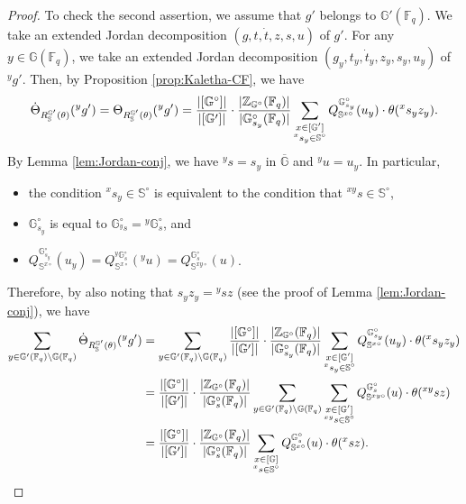 \documentclass{amsart}
\newcommand{\F}{\mathbb{F}}
\newcommand{\bbS}{\mathbb{S}}
\newcommand{\bbG}{\mathbb{G}}
\newcommand{\bbZ}{\mathbb{Z}}
\theoremstyle{plain}
\theoremstyle{definition}
\theoremstyle{remark}
\theoremstyle{theorem}
\begin{document}
\begin{proof}
To check the second assertion, we assume that $g'$ belongs to $\bbG'(\F_{q})$.
We take an extended Jordan decomposition $(g,t,\dot{t},z,s,u)$ of $g'$.
For any $y\in\bbG(\F_{q})$, we take an extended Jordan decomposition $(g_{y},t_{y},\dot{t}_{y},z_{y},s_{y},u_{y})$ of ${}^{y}g'$.
Then, by Proposition \ref{prop:Kaletha-CF}, we have
\[
\dot{\Theta}_{R_{\bbS}^{\bbG'}(\theta)}({}^{y}g')
=
\Theta_{R_{\bbS}^{\bbG'}(\theta)}({}^{y}g')
=
\frac{|[\bbG^{\circ}]|}{|[\bbG']|}
\cdot\frac{|\bbZ_{\bbG^{\circ}}(\F_{q})|}{|\bbG^{\circ}_{s_{y}}(\F_{q})|}
\sum_{\begin{subarray}{c}x\in [\bbG'] \\ {}^{x}s_{y}\in\bbS^{\circ}\end{subarray}}
Q^{\bbG^{\circ}_{s_{y}}}_{\bbS^{x\circ}}(u_{y})\cdot \theta({}^{x}s_{y}z_{y}).
\]
By Lemma \ref{lem:Jordan-conj}, we have ${}^{y}s=s_{y}$ in $\overline{\bbG}$ and ${}^{y}u=u_{y}$.
In particular,
\begin{itemize}
\item
the condition ${}^{x}s_{y}\in\bbS^{\circ}$ is equivalent to the condition that ${}^{xy}s\in\bbS^{\circ}$,
\item
$\bbG_{s_{y}}^{\circ}$ is equal to $\bbG_{{}^{y}s}^{\circ}={}^{y}\bbG_{s}^{\circ}$, and
\item
$Q^{\bbG^{\circ}_{s_{y}}}_{\bbS^{x\circ}}(u_{y})=Q^{{}^{y}\bbG^{\circ}_{s}}_{\bbS^{x\circ}}({}^{y}u)=Q^{\bbG^{\circ}_{s}}_{\bbS^{xy\circ}}(u)$.
\end{itemize}
Therefore, by also noting that $s_{y}z_{y}={}^{y}sz$ (see the proof of Lemma \ref{lem:Jordan-conj}), we have
\begin{align*}
\sum_{y\in \bbG'(\F_{q})\backslash\bbG(\F_{q})}\dot{\Theta}_{R_{\bbS}^{\bbG'}(\theta)}({}^{y}g')
&=
\sum_{y\in \bbG'(\F_{q})\backslash\bbG(\F_{q})}
\frac{|[\bbG^{\circ}]|}{|[\bbG']|}
\cdot\frac{|\bbZ_{\bbG^{\circ}}(\F_{q})|}{|\bbG^{\circ}_{s_{y}}(\F_{q})|}
\sum_{\begin{subarray}{c}x\in [\bbG'] \\ {}^{x}s_{y}\in\bbS^{\circ}\end{subarray}}
Q^{\bbG^{\circ}_{s_{y}}}_{\bbS^{x\circ}}(u_{y})\cdot \theta({}^{x}s_{y}z_{y})\\
&=
\frac{|[\bbG^{\circ}]|}{|[\bbG']|}
\cdot\frac{|\bbZ_{\bbG^{\circ}}(\F_{q})|}{|\bbG^{\circ}_{s}(\F_{q})|}
\sum_{y\in \bbG'(\F_{q})\backslash\bbG(\F_{q})}
\sum_{\begin{subarray}{c}x\in [\bbG'] \\ {}^{xy}s\in\bbS^{\circ}\end{subarray}}
Q^{\bbG^{\circ}_{s}}_{\bbS^{xy\circ}}(u)\cdot \theta({}^{xy}sz)\\
&=
\frac{|[\bbG^{\circ}]|}{|[\bbG']|}
\cdot\frac{|\bbZ_{\bbG^{\circ}}(\F_{q})|}{|\bbG^{\circ}_{s}(\F_{q})|}
\sum_{\begin{subarray}{c}x\in [\bbG] \\ {}^{x}s\in\bbS^{\circ}\end{subarray}}
Q^{\bbG^{\circ}_{s}}_{\bbS^{x\circ}}(u)\cdot \theta({}^{x}sz).\qedhere
\end{align*}
\end{proof}
\end{document}
